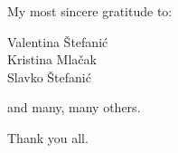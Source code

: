 \documentclass[a5paper,12pt]{book} %
\begin{document}
\thispagestyle{empty}
\vspace*{0.1\textheight}
\clearpage %

\thispagestyle{empty}
\vspace*{0.2\textheight}
\begin{flushright}
My most sincere gratitude to:

Valentina Štefanić \\
Kristina Mlačak \\
Slavko Štefanić

and many, many others.

Thank you all.
\end{flushright}
\clearpage %

\thispagestyle{empty}
\vspace*{0.1\textheight}
\clearpage %












\end{document}
